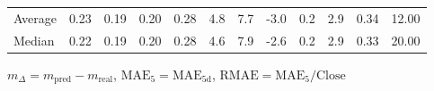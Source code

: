 \begin{threeparttable}
{\begin{tabular}{lrrrrrrrrrrr}
Average &          0.23 &          0.19 &          0.20 &        0.28 &                 4.8 &                 7.7 &       -3.0 &                 0.2 &              2.9 &            0.34 &                  12.00 \\
 Median &          0.22 &          0.19 &          0.20 &        0.28 &                 4.6 &                 7.9 &       -2.6 &                 0.2 &              2.9 &            0.33 &                  20.00 \\
\bottomrule
\end{tabular}
}
\begin{tablenotes}\footnotesize
\item $m_\Delta=m_{\text{pred}}-m_{\text{real}}$,
$\mathrm{MAE}_5=\mathrm{MAE}_{5\text{d}}$,
$\mathrm{RMAE}=\mathrm{MAE}_5/\text{Close}$
\end{tablenotes}
\end{threeparttable}
\endgroup

